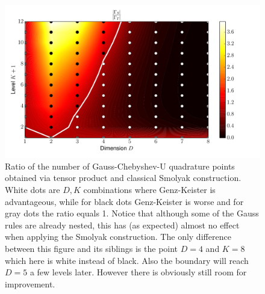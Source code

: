 \documentclass[a4paper,10pt]{article}
\begin{document}
\begin{figure}[h]
  \centering
  \includegraphics[width=0.8\linewidth]{./img/smol_chebyshevu_ratio.pdf}
  \caption{Ratio of the number of Gauss-Chebyshev-U quadrature points obtained
  via tensor product and classical Smolyak construction. White dots are $D,K$
  combinations where Genz-Keister is advantageous, while for black dots
  Genz-Keister is worse and for gray dots the ratio equals 1.
  Notice that although some of the Gauss rules are already nested, this has
  (as expected) almost no effect when applying the Smolyak construction.
  The only difference between this figure and its siblings is the point
  $D=4$ and $K=8$ which here is white instead of black. Also the boundary
  will reach $D=5$ a few levels later. However there is obviously still
  room for improvement.}
  \label{fig:smol_chebyshevu_ratio}
\end{figure}
\end{document}
